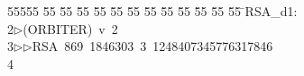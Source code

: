 %
%
\begin{tabbing}
55555 \= 55 \= 55 \= 55 \= 55 \= 55 \= 55 \= 55 \= 55 \= 55 \= 55 \= 55 \= 55 \= \>RSA\_d1:\\[0pt]
2\>$\triangleright$\>(ORBITER)\ v\ 2\ \\[0pt]
3\>$\triangleright$\>$\triangleright$\>RSA\ 869\ 1846303\ 3\ 1248407345776317846\\[0pt]
4\>\end{tabbing}
